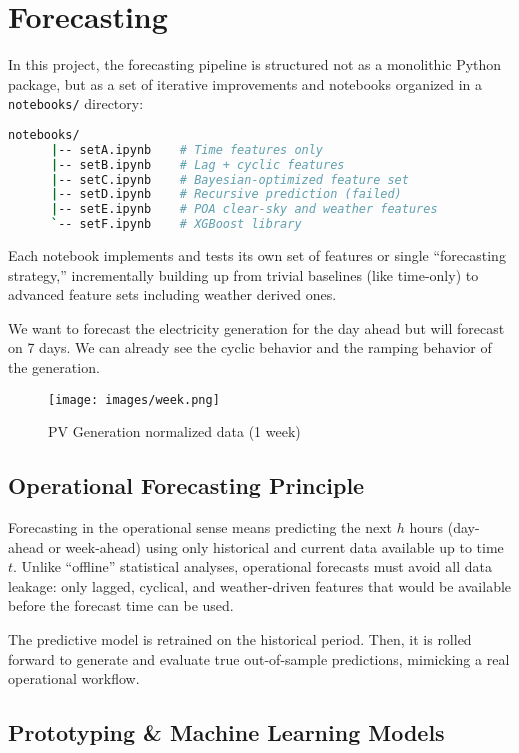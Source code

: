 \newpage
\section{Forecasting}
\label{sec:forecasting}

In this project, the forecasting pipeline is structured not as a monolithic Python 
package, but as a set of iterative improvements and notebooks organized in a 
\texttt{notebooks/} directory:
\begin{lstlisting}[language=bash, numbers=none, backgroundcolor=\color{white}]
    notebooks/
      |-- setA.ipynb    # Time features only
      |-- setB.ipynb    # Lag + cyclic features
      |-- setC.ipynb    # Bayesian-optimized feature set
      |-- setD.ipynb    # Recursive prediction (failed)
      |-- setE.ipynb    # POA clear-sky and weather features
      `-- setF.ipynb    # XGBoost library
\end{lstlisting}
    
Each notebook implements and tests its own set of features or single 
“forecasting strategy,” incrementally building up from trivial baselines (like 
time-only) to advanced feature sets including weather derived ones. 

We want to forecast the electricity generation for the day ahead but will forecast on 7 days.
We can already see the cyclic behavior and the ramping behavior of the generation.
\begin{figure}[h!]
\centering
\texttt{[image: images/week.png]}
\caption{PV Generation normalized data (1 week)}
\label{fig:week}
\end{figure}

\subsection{Operational Forecasting Principle}
Forecasting in the operational sense means predicting the next $h$ hours 
(day-ahead or week-ahead) using only historical and current data available up to time 
$t$. Unlike “offline” statistical analyses, operational forecasts must avoid all data 
leakage: only lagged, cyclical, and weather-driven features that would be available 
before the forecast time can be used. 

The predictive model is retrained on the historical period. Then, it is rolled forward 
to generate and evaluate true out-of-sample predictions, mimicking a real operational 
workflow.

\subsection{Prototyping \& Machine Learning Models}
\label{subsec:model-pool}

